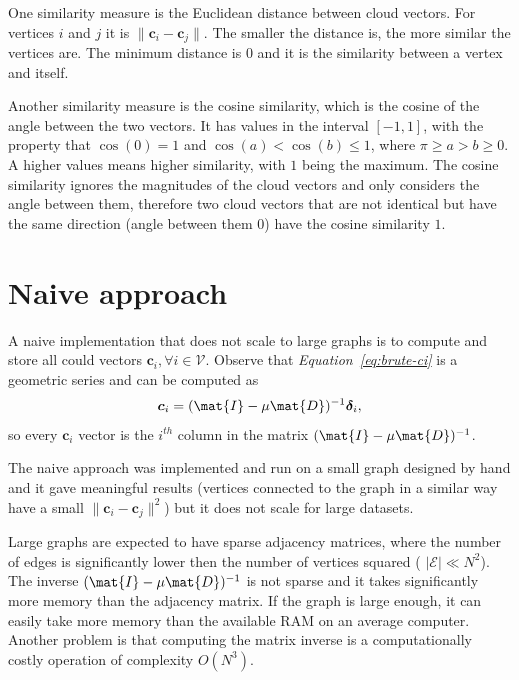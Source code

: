 \documentclass[12pt]{report}
\begin{document}
One similarity measure is the Euclidean distance between cloud vectors. For
vertices $i$ and $j$ it is $\|\bm{c}_i - \bm{c}_j\|$. The smaller the distance
is, the more similar the vertices are. The minimum distance is $0$ and it is the
similarity between a vertex and itself.

Another similarity measure is the cosine similarity, which is the cosine of the
angle between the two vectors. It has values in the interval $[-1,1]$, with the
property that $\cos(0) = 1$ and $\cos(a) < \cos(b) \leq 1$, where $\pi \geq a > b
\geq 0$. A higher values means higher similarity, with $1$ being the maximum. The
cosine similarity ignores the magnitudes of the cloud vectors and only considers
the angle between them, therefore two cloud vectors that are not identical but
have the same direction (angle between them $0$) have the cosine similarity $1$.

%
%
\section{Naive approach}
%
A naive implementation that does not scale to large graphs is to compute and
store all could vectors $\bm{c}_i, \forall i \in \mathcal{V}$. Observe that
\emph{Equation~\ref{eq:brute-ci}} is a geometric series and can be computed as
\begin{align}
  \label{eq:ci_inverse}
  \bm{c}_i = (\mat{I} - \mu \mat{D})^{-1} \bm{\delta}_i,
\end{align}
so every $\bm{c}_i$ vector is the $i^{th}$ column in the matrix $(\mat{I} -
\mu \mat{D})^{-1}$.

The naive approach was implemented and run on a small graph designed by hand and it gave
meaningful results (vertices connected to the graph in a similar way have a small
$\|\bm{c}_i - \bm{c}_j\|^2$) but it does not scale for large datasets.

Large graphs are expected to have sparse adjacency matrices, where the
number of edges is significantly lower then the number of vertices squared (
$|\mathcal{E}| \ll N^2$). The inverse $(\mat{I} - \mu \mat{D})^{-1}$ is
not sparse and it takes significantly more memory than the adjacency matrix. If
the graph is large enough, it can easily take more memory than the available RAM
on an average computer. Another problem is that computing the matrix inverse is
a computationally costly operation of complexity $O(N^3)$.
\end{document}
